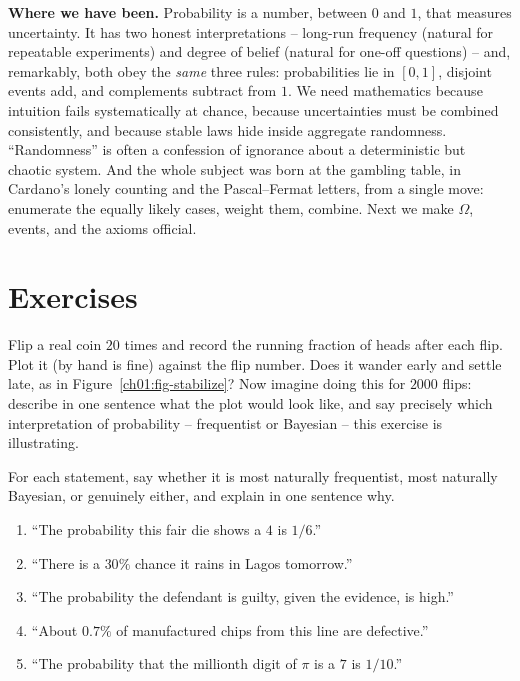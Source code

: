 \begin{recoverybox}
\textbf{Where we have been.} Probability is a number, between $0$ and $1$, that
measures uncertainty. It has two honest interpretations -- long-run frequency
(natural for repeatable experiments) and degree of belief (natural for one-off
questions) -- and, remarkably, both obey the \emph{same} three rules: probabilities
lie in $[0,1]$, disjoint events add, and complements subtract from $1$. We need
mathematics because intuition fails systematically at chance, because uncertainties
must be combined consistently, and because stable laws hide inside aggregate
randomness. ``Randomness'' is often a confession of ignorance about a deterministic
but chaotic system. And the whole subject was born at the gambling table, in
Cardano's lonely counting and the Pascal--Fermat letters, from a single move:
enumerate the equally likely cases, weight them, combine. Next we make $\Omega$,
events, and the axioms official.
\end{recoverybox}

\section{Exercises}
\label{ch01:exercises}

\begin{exercise}
\label{ch01:ex-sim}
Flip a real coin $20$ times and record the running fraction of heads after each
flip. Plot it (by hand is fine) against the flip number. Does it wander early and
settle late, as in Figure~\ref{ch01:fig-stabilize}? Now imagine doing this for
$2000$ flips: describe in one sentence what the plot would look like, and say
precisely which interpretation of probability -- frequentist or Bayesian -- this
exercise is illustrating.
\end{exercise}

\begin{exercise}
\label{ch01:ex-name}
For each statement, say whether it is most naturally frequentist, most naturally
Bayesian, or genuinely either, and explain in one sentence why.
\begin{enumerate}
\item ``The probability this fair die shows a $4$ is $1/6$.''
\item ``There is a $30\%$ chance it rains in Lagos tomorrow.''
\item ``The probability the defendant is guilty, given the evidence, is high.''
\item ``About $0.7\%$ of manufactured chips from this line are defective.''
\item ``The probability that the millionth digit of $\pi$ is a $7$ is $1/10$.''
\end{enumerate}
\end{exercise}

